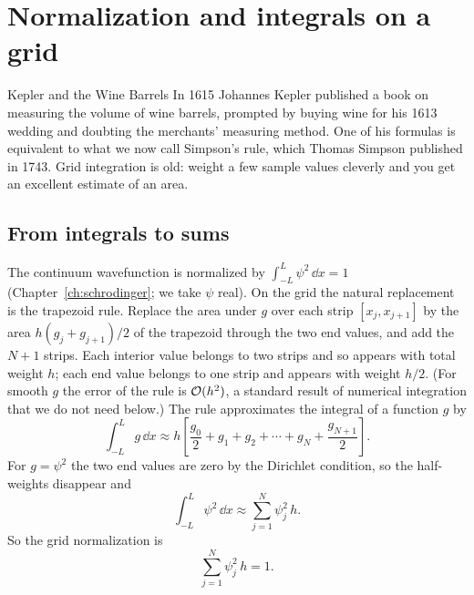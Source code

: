 \section{Normalization and integrals on a grid}\label{sec:finite-differences-normalization}
\begin{didyouknow}{Kepler and the Wine Barrels}
In 1615 Johannes Kepler published a book on measuring the volume of wine barrels, prompted by buying wine for his 1613 wedding and doubting the merchants' measuring method. One of his formulas is equivalent to what we now call Simpson's rule, which Thomas Simpson published in 1743. Grid integration is old: weight a few sample values cleverly and you get an excellent estimate of an area.
\end{didyouknow}

\subsection{From integrals to sums}

The continuum wavefunction is normalized by $\int_{-L}^{L}\psi^2\,\dd x=1$ (Chapter~\ref{ch:schrodinger}; we take $\psi$ real). On the grid the natural replacement is the trapezoid rule. Replace the area under $g$ over each strip $[x_j,x_{j+1}]$ by the area $h(g_j+g_{j+1})/2$ of the trapezoid through the two end values, and add the $N+1$ strips. Each interior value belongs to two strips and so appears with total weight $h$; each end value belongs to one strip and appears with weight $h/2$. (For smooth $g$ the error of the rule is $\mathcal{O}(h^2)$, a standard result of numerical integration \cite{nr} that we do not need below.) The rule approximates the integral of a function $g$ by
\begin{equation*}
\int_{-L}^{L}g\,\dd x\approx h\left[\frac{g_0}{2}+g_1+g_2+\cdots+g_N+\frac{g_{N+1}}{2}\right].
\end{equation*}
For $g=\psi^2$ the two end values are zero by the Dirichlet condition, so the half-weights disappear and
\begin{equation}
\int_{-L}^{L}\psi^2\,\dd x\approx\sum_{j=1}^{N}\psi_j^2\,h.
\label{eq:finite-differences-norm-sum}
\end{equation}
So the grid normalization is
\begin{equation}
\boxed{\;\sum_{j=1}^{N}\psi_j^2\,h=1.\;}
\label{eq:finite-differences-norm}
\end{equation}

